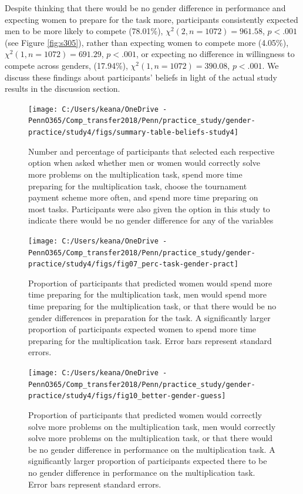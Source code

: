 \documentclass[a4paper, nobind]{templates/ociamthesis}
\begin{document}
Despite thinking that there would be no gender difference in performance and expecting women to prepare for the task more, participants consistently expected men to be more likely to compete (78.01\%), \(\chi^2(2, n = 1072) = 961.58\), \(p < .001\) (see Figure \ref{fig:s305}), rather than expecting women to compete more (4.05\%), \(\chi^2(1, n = 1072) = 691.29\), \(p < .001\), or expecting no difference in willingness to compete across genders, (17.94\%), \(\chi^2(1, n = 1072) = 390.08\), \(p < .001\). We discuss these findings about participants' beliefs in light of the actual study results in the discussion section.

\begin{figure}

{\centering \texttt{[image: C:/Users/keana/OneDrive - PennO365/Comp\_transfer2018/Penn/practice\_study/gender-practice/study4/figs/summary-table-beliefs-study4]} 

}

\caption{Number and percentage of participants that selected each respective option when asked whether men or women would correctly solve more problems on the multiplication task, spend more time preparing for the multiplication task, choose the tournament payment scheme more often, and spend more time preparing on most tasks. Participants were also given the option in this study to indicate there would be no gender difference for any of the variables}\label{fig:summary-table-beliefs-study4}
\end{figure}

\begin{figure}

{\centering \texttt{[image: C:/Users/keana/OneDrive - PennO365/Comp\_transfer2018/Penn/practice\_study/gender-practice/study4/figs/fig07\_perc-task-gender-pract]} 

}

\caption{Proportion of participants that predicted women would spend more time preparing for the multiplication task, men would spend more time preparing for the multiplication task, or that there would be no gender differences in preparation for the task. A significantly larger proportion of participants expected women to spend more time preparing for the multiplication task. Error bars represent standard errors.}\label{fig:s303}
\end{figure}

\begin{figure}

{\centering \texttt{[image: C:/Users/keana/OneDrive - PennO365/Comp\_transfer2018/Penn/practice\_study/gender-practice/study4/figs/fig10\_better-gender-guess]} 

}

\caption{Proportion of participants that predicted women would correctly solve more problems on the multiplication task, men would correctly solve more problems on the multiplication task, or that there would be no gender difference in performance on the multiplication task. A significantly larger proportion of participants expected there to be no gender difference in performance on the multiplication task. Error bars represent standard errors.}\label{fig:s304}
\end{figure}
\end{document}
